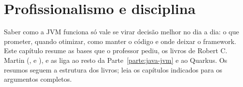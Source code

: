 \chapter{Profissionalismo e disciplina}
\label{cap:profissional}

\proximasaulas

Saber como a JVM funciona só vale se virar decisão melhor no dia a dia:
o que prometer, quando otimizar, como manter o código e onde deixar o
framework. Este capítulo resume as bases que o professor pediu, os livros
de Robert C. Martin (, 
e ), e as liga ao resto da Parte~\ref{parte:java-jvm} e ao
Quarkus. Os resumos seguem a estrutura dos livros; leia os capítulos
indicados para os argumentos completos.






